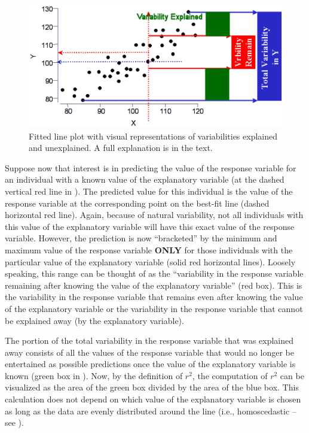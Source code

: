 \documentclass[10pt,openany]{book}\usepackage[]{graphicx}\usepackage[]{color}
\begin{document}
\begin{figure}[htbp]
  \centering
    \includegraphics[width=5in]{Figs/rsq3.png}
  \caption{Fitted line plot with visual representations of variabilities explained and unexplained.  A full explanation is in the text.}
  \label{fig:CoeffDeterm}
\end{figure}

Suppose now that interest is in predicting the value of the response variable for an individual with a known value of the explanatory variable (at the dashed vertical red line in ).  The predicted value for this individual is the value of the response variable at the corresponding point on the best-fit line (dashed horizontal red line).  Again, because of natural variability, not all individuals with this value of the explanatory variable will have this exact value of the response variable.  However, the prediction is now ``bracketed'' by the minimum and maximum value of the response variable \textbf{ONLY} for those individuals with the particular value of the explanatory variable (solid red horizontal lines).  Loosely speaking, this range can be thought of as the ``variability in the response variable remaining after knowing the value of the explanatory variable'' (red box).  This is the variability in the response variable that remains even after knowing the value of the explanatory variable or the variability in the response variable that cannot be explained away (by the explanatory variable).

The portion of the total variability in the response variable that was explained away consists of all the values of the response variable that would no longer be entertained as possible predictions once the value of the explanatory variable is known (green box in ).  Now, by the definition of $r^{2}$, the computation of $r^{2}$ can be visualized as the area of the green box divided by the area of the blue box.  This calculation does not depend on which value of the explanatory variable is chosen as long as the data are evenly distributed around the line (i.e., homoscedastic -- see ).
\end{document}
